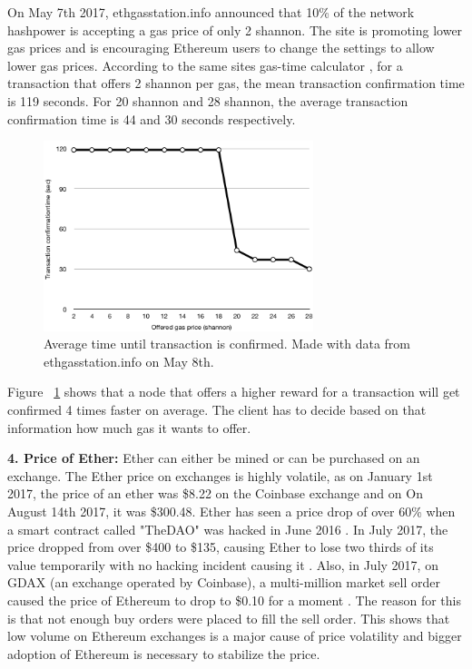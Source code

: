 On May 7th 2017, ethgasstation.info announced \cite{ETHGasStationAnnouncement} that 10\% of the network hashpower is accepting a gas price of only 2 shannon. The site is promoting lower gas prices and is encouraging Ethereum users to change the settings to allow lower gas prices. According to the same sites gas-time calculator \cite{ETHGasStationCalc}, for a transaction that offers 2 shannon per gas, the mean transaction confirmation time is 119 seconds. For 20 shannon and 28 shannon, the average transaction confirmation time is 44 and 30 seconds respectively.

\begin{figure}[H]
\centering
\includegraphics[width=0.7\textwidth]{gas-vs-transaction-time.png}
\caption{Average time until transaction is confirmed. Made with data from ethgasstation.info on May 8th.}
\label{fig:gas}
\end{figure}
 
Figure ~\ref{fig:gas} shows that a node that offers a higher reward for a transaction will get confirmed 4 times faster on average. The client has to decide based on that information how much gas it wants to offer.

\textbf{4. Price of Ether:} Ether can either be mined or can be purchased on an exchange. The Ether price on exchanges is highly volatile, as  on January 1st 2017, the price of an ether was \$8.22 on the Coinbase exchange \cite{Coinbase} and on On August 14th 2017, it was \$300.48. Ether has seen a price drop of over 60\% when a smart contract called "TheDAO" was hacked in June 2016 \cite{DAO}. In July 2017, the price dropped from over \$400 to \$135, causing Ether to lose two thirds of its value temporarily with no hacking incident causing it \cite{Coinbase}. Also, in July 2017, on GDAX (an exchange operated by Coinbase), a multi-million market sell order caused the price of Ethereum to drop to \$0.10 for a moment \cite{EthereumCent}. The reason for this is that not enough buy orders were placed to fill the sell order. This shows that low volume on Ethereum exchanges is a major cause of price volatility and bigger adoption of Ethereum is necessary to stabilize the price.

